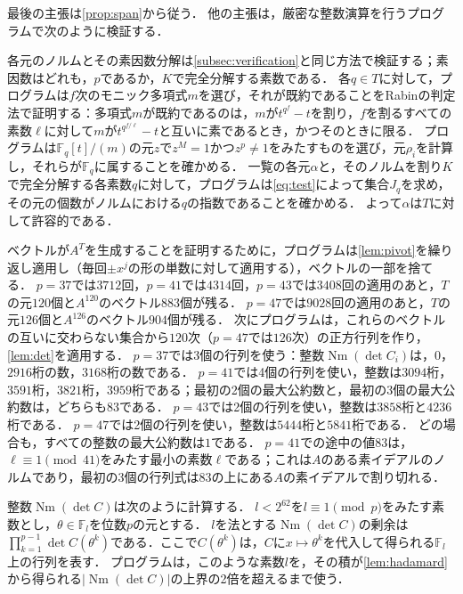\documentclass[11pt,a4paper]{ltjsarticle}
\makeatletter
\theoremstyle{ja}
\renewenvironment{proof}[1][証明]{\par
  \pushQED{\qed}\normalfont \topsep6\p@\@plus6\p@\relax
  \trivlist
  \item[\hskip\labelsep\bfseries #1]\hspace{1\zw}\ignorespaces
}{\popQED\endtrivlist\@endpefalse}
\makeatother
\begin{document}
\begin{proof}
最後の主張は\cref{prop:span}から従う．
他の主張は，厳密な整数演算を行うプログラムで次のように検証する．

各元のノルムとその素因数分解は\cref{subsec:verification}と同じ方法で検証する；素因数はどれも，$p$であるか，$K$で完全分解する素数である．
各$q \in T$に対して，プログラムは$f$次のモニック多項式$m$を選び，それが既約であることをRabinの判定法\cite{Ra80}で証明する：多項式$m$が既約であるのは，$m$が$t^{q^f} - t$を割り，$f$を割るすべての素数$\ell$に対して$m$が$t^{q^{f/\ell}} - t$と互いに素であるとき，かつそのときに限る．
プログラムは$\mathbb{F}_q[t]/(m)$の元$z$で$z^M = 1$かつ$z^p \ne 1$をみたすものを選び，元$\rho_i$を計算し，それらが$\mathbb{F}_q$に属することを確かめる．
一覧の各元$\alpha$と，そのノルムを割り$K$で完全分解する各素数$q$に対して，プログラムは\eqref{eq:test}によって集合$J_q$を求め，その元の個数がノルムにおける$q$の指数であることを確かめる．
よって$\alpha$は$T$に対して許容的である．

ベクトルが$A^T$を生成することを証明するために，プログラムは\cref{lem:pivot}を繰り返し適用し（毎回$\pm x^j$の形の単数に対して適用する），ベクトルの一部を捨てる．
$p = 37$では$3712$回，$p = 41$では$4314$回，$p = 43$では$3408$回の適用のあと，$T$の元$120$個と$A^{120}$のベクトル$883$個が残る．
$p = 47$では$9028$回の適用のあと，$T$の元$126$個と$A^{126}$のベクトル$904$個が残る．
次にプログラムは，これらのベクトルの互いに交わらない集合から$120$次（$p = 47$では$126$次）の正方行列を作り，\cref{lem:det}を適用する．
$p = 37$では3個の行列を使う：整数$\operatorname{Nm}(\det C_i)$は，$0$，$2916$桁の数，$3168$桁の数である．
$p = 41$では4個の行列を使い，整数は$3094$桁，$3591$桁，$3821$桁，$3959$桁である；最初の2個の最大公約数と，最初の3個の最大公約数は，どちらも$83$である．
$p = 43$では2個の行列を使い，整数は$3858$桁と$4236$桁である．
$p = 47$では2個の行列を使い，整数は$5444$桁と$5841$桁である．
どの場合も，すべての整数の最大公約数は$1$である．
$p = 41$での途中の値$83$は，$\ell \equiv 1 \pmod{41}$をみたす最小の素数$\ell$である；これは$A$のある素イデアルのノルムであり，最初の3個の行列式は$83$の上にある$A$の素イデアルで割り切れる．

整数$\operatorname{Nm}(\det C)$は次のように計算する．
$l < 2^{62}$を$l \equiv 1 \pmod{p}$をみたす素数とし，$\theta \in \mathbb{F}_l$を位数$p$の元とする．
$l$を法とする$\operatorname{Nm}(\det C)$の剰余は$\prod_{k=1}^{p-1} \det C(\theta^k)$である．ここで$C(\theta^k)$は，$C$に$x \mapsto \theta^k$を代入して得られる$\mathbb{F}_l$上の行列を表す．
プログラムは，このような素数$l$を，その積が\cref{lem:hadamard}から得られる$|\operatorname{Nm}(\det C)|$の上界の2倍を超えるまで使う．
\end{proof}
\end{document}
